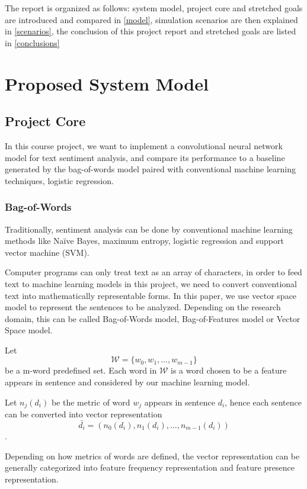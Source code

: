 \documentclass[conference]{IEEEtran}
\begin{document}
    The report is organized as follows: system model, project core
    and stretched goals are introduced and compared 
    in \autoref{model}, simulation scenarios are then explained in 
    \autoref{scenarios}, the conclusion of this 
    project report and stretched goals are listed in \autoref{conclusions}

\section{Proposed System Model}
\label{model}

\subsection{Project Core}
\label{model:core}
    In this course project, we want to implement a convolutional neural network
    model for text sentiment analysis, and compare its performance to a baseline
    generated by the bag-of-words model paired with conventional machine learning
    techniques, logistic regression.
    
\subsubsection{Bag-of-Words}
\label{model:core:bow}
    Traditionally, sentiment analysis can be done by conventional machine learning
    methods like Na\"ive Bayes, maximum entropy, logistic regression and 
    support vector machine (SVM). 
    
    Computer programs can only treat text as an array of characters, 
    in order to feed text to machine learning models in this project, we need to 
    convert conventional text into mathematically representable forms. In this
    paper, we use vector space model to represent the sentences to be analyzed.
    Depending on the research domain, this can be called Bag-of-Words model, 
    Bag-of-Features model or Vector Space model\cite{salton1975vector}.
    
    Let $$\mathcal{W}=\{w_0, w_1,\ldots, w_{m-1}\}$$ be a m-word predefined set. Each 
    word in $\mathcal{W}$ is a word chosen to be a feature appears in sentence and 
    considered by our machine learning model.
    
    Let $n_j(d_i)$ be the metric of word $w_j$ appears in sentence $d_i$, hence each 
    sentence can be converted into vector representation 
    $$\bar{d_i}=(n_0(d_i),n_1(d_i),\ldots,n_{m-1}(d_i))$$.
    
    Depending on how metrics of words are defined, the vector representation can be
    generally categorized into feature frequency representation and feature presence
    representation\cite{pang2002thumbs}.
\end{document}
